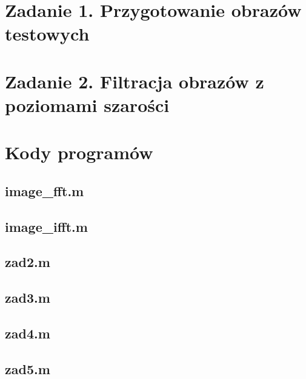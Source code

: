 





 


\section*{Zadanie 1. Przygotowanie obrazów testowych}
\section*{Zadanie 2. Filtracja obrazów z poziomami szarości}












\newpage \section*{Kody programów}

\subsection*{image\_fft.m     }
\subsection*{image\_ifft.m    } \newpage
\subsection*{zad2.m           } \newpage
\subsection*{zad3.m           } \newpage
\subsection*{zad4.m           } \newpage
\subsection*{zad5.m           } \newpage









